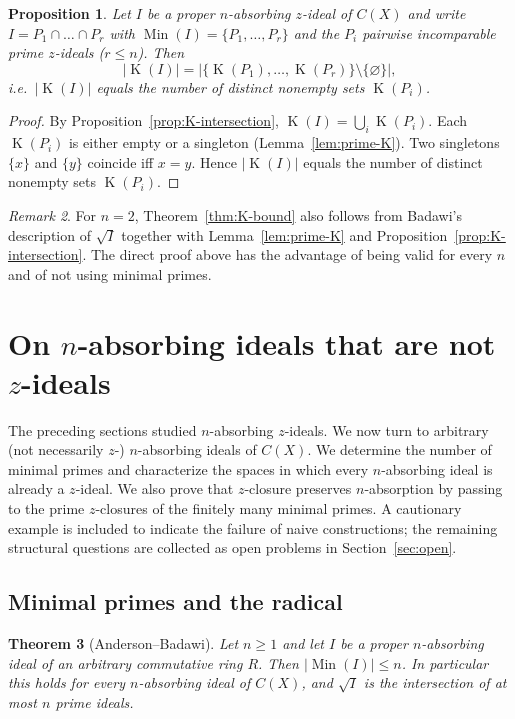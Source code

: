 \documentclass[11pt]{amsart}
\newtheorem{theorem}{Theorem}[section]
\newtheorem{proposition}[theorem]{Proposition}
\theoremstyle{definition}
\theoremstyle{remark}
\newtheorem{remark}[theorem]{Remark}
\DeclareMathOperator{\Min}{Min}
\DeclareMathOperator{\K}{K}
\begin{document}
\begin{proposition}
\label{prop:K-vs-Min}
Let $I$ be a proper $n$-absorbing $z$-ideal of $C(X)$ and write
$I=P_1\cap\dots\cap P_r$ with $\Min(I)=\{P_1,\dots,P_r\}$ and the $P_i$
pairwise incomparable prime $z$-ideals ($r\le n$). Then
\[
|\K(I)|=\bigl|\{\K(P_1),\dots,\K(P_r)\}\setminus\{\varnothing\}\bigr|,
\]
i.e.\ $|\K(I)|$ equals the number of distinct nonempty sets $\K(P_i)$.
\end{proposition}

\begin{proof}
By Proposition~\ref{prop:K-intersection},
$\K(I)=\bigcup_i\K(P_i)$. Each $\K(P_i)$ is either empty or a singleton
(Lemma~\ref{lem:prime-K}). Two singletons $\{x\}$ and $\{y\}$ coincide
iff $x=y$. Hence $|\K(I)|$ equals the number of distinct nonempty sets
$\K(P_i)$.
\end{proof}

\begin{remark}
For $n=2$, Theorem~\ref{thm:K-bound} also follows from Badawi's
description of $\sqrt I$ together with Lemma~\ref{lem:prime-K} and
Proposition~\ref{prop:K-intersection}. The direct proof above has the
advantage of being valid for every $n$ and of not using minimal primes.
\end{remark}

\section{On \texorpdfstring{$n$}{n}-absorbing ideals that are not \texorpdfstring{$z$}{z}-ideals}
\label{sec:nonz}

The preceding sections studied $n$-absorbing \emph{$z$}-ideals.
We now turn to arbitrary (not necessarily $z$-) $n$-absorbing ideals of
$C(X)$. We determine the number of minimal primes and characterize the
spaces in which every $n$-absorbing ideal is already a $z$-ideal. We also
prove that $z$-closure preserves $n$-absorption by passing to the
prime $z$-closures of the finitely many minimal primes.
A cautionary example is included to indicate the failure of naive
constructions; the remaining structural questions are collected as
open problems in Section~\ref{sec:open}.

\subsection{Minimal primes and the radical}

\begin{theorem}[Anderson--Badawi]
\label{thm:radical-nabs}
Let $n\ge1$ and let $I$ be a proper $n$-absorbing ideal of an arbitrary
commutative ring $R$. Then $|\operatorname{Min}(I)|\le n$. In particular
this holds for every $n$-absorbing ideal of $C(X)$, and $\sqrt{I}$ is the
intersection of at most $n$ prime ideals.
\end{theorem}
\end{document}
